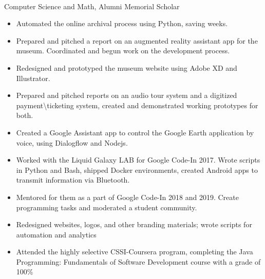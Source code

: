\documentclass[a4paper]{resume}
\begin{document}
\vspace*{-20pt}



\vspace{20pt}

\\Computer Science and Math, Alumni Memorial Scholar
\vspace{5pt}
\enresection

\begin{itemize} \vspace{-5pt} \itemsep -2pt
	\item Automated the online archival process using Python, saving weeks.
	\item Prepared and pitched a report on an augmented reality assistant app for the museum. Coordinated and begun work on the development process.
	\item Redesigned and prototyped the museum website using Adobe XD and Illustrator.
	\item Prepared and pitched reports on an audio tour system and a digitized payment\textbackslash ticketing system, created and demonstrated working prototypes for both.
\end{itemize}
\enresubsection
{}
\begin{itemize} \vspace{-5pt} \itemsep -2pt
	\item Created a Google Assistant app to control the Google Earth application by voice, using Dialogflow and Nodejs.	
	\item Worked with the Liquid Galaxy LAB for Google Code-In 2017. Wrote scripts in Python and Bash, shipped Docker environments, created Android apps to transmit information via Bluetooth.
	\item Mentored for them as a part of Google Code-In 2018 and 2019. Create programming tasks and moderated a student community.
\end{itemize}
\enresubsection
{}
\begin{itemize} \vspace{-5pt} \itemsep -2pt
	\item Redesigned websites, logos, and other branding materials; wrote scripts for automation and analytics
\end{itemize}
\enresubsection
{}
\begin{itemize} \vspace{-5pt} \itemsep -2pt
	\item Attended the highly selective CSSI-Coursera program, completing the Java Programming: Fundamentals of Software Development course with a grade of 100\%
\end{itemize}
\enresection
\end{document}
